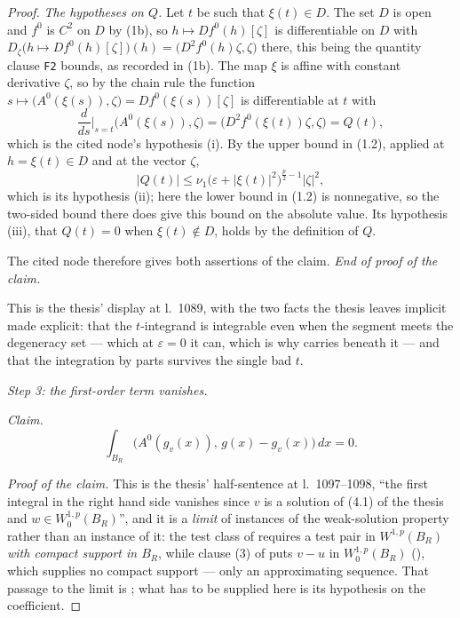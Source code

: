 \begin{proof}
\emph{The hypotheses on $Q$.}  Let $t$ be such that $\xi(t)\in D$.  The set $D$
is open and $f^0$ is $C^2$ on $D$ by (1b), so $h\mapsto Df^0(h)[\zeta]$ is
differentiable on $D$ with $D_\zeta\bigl(h\mapsto Df^0(h)[\zeta]\bigr)(h)
=\bigl(D^2f^0(h)\zeta,\zeta\bigr)$ there, this being the quantity clause
\texttt{F2} bounds, as recorded in (1b).  The map $\xi$ is affine with constant
derivative $\zeta$, so by the chain rule the function
$s\mapsto\bigl(A^0(\xi(s)),\zeta\bigr)=Df^0(\xi(s))[\zeta]$ is differentiable at
$t$ with
\[
\frac{d}{ds}\Big|_{s=t}\bigl(A^0(\xi(s)),\zeta\bigr)
=\bigl(D^2f^0(\xi(t))\zeta,\zeta\bigr)=Q(t),
\tag{2.3}
\]
which is the cited node's hypothesis (i).  By the upper bound in (1.2), applied
at $h=\xi(t)\in D$ and at the vector $\zeta$,
\[
|Q(t)|\le\nu_1\bigl(\varepsilon+|\xi(t)|^2\bigr)^{\frac p2-1}|\zeta|^2 ,
\tag{2.4}
\]
which is its hypothesis (ii); here the lower bound in (1.2) is nonnegative, so
the two-sided bound there does give this bound on the absolute value.  Its
hypothesis (iii), that $Q(t)=0$ when $\xi(t)\notin D$, holds by the definition
of $Q$.

The cited node therefore gives both assertions of the claim.
\emph{End of proof of the claim.}

This is the thesis' display at l.~1089, with the two facts the thesis leaves
implicit made explicit: that the $t$-integrand is integrable even when the
segment meets the degeneracy set --- which at $\varepsilon=0$ it can, which is
why  carries
 beneath it --- and that the integration by
parts survives the single bad $t$.

\medskip
\noindent\emph{Step 3: the first-order term vanishes.}

\emph{Claim.}
\[
\int_{B_R}\bigl(A^0(g_v(x)),\,g(x)-g_v(x)\bigr)\,dx=0 .
\tag{3.1}
\]

\emph{Proof of the claim.}  This is the thesis' half-sentence at
l.~1097--1098, ``the first integral in the right hand side vanishes since $v$ is
a solution of (4.1) of the thesis and $w\in W^{1,p}_0(B_R)$'', and it is a
\emph{limit} of instances of the weak-solution property rather than an instance
of it: the test class of  requires a test pair in
$W^{1,p}(B_R)$ \emph{with compact support in $B_R$}, while clause (3) of
 puts $v-u$ in $W^{1,p}_0(B_R)$
(), which supplies no compact support --- only an
approximating sequence.  That passage to the limit is
; what has to be supplied here is its hypothesis
on the coefficient.


\end{proof}
